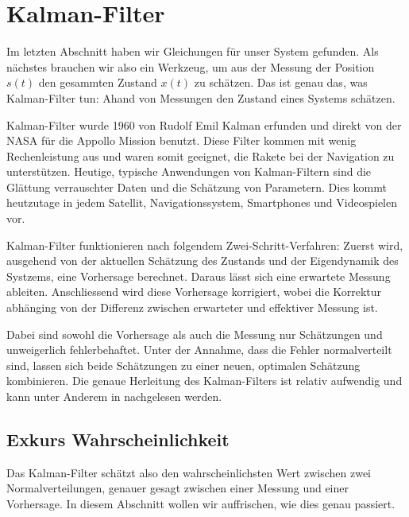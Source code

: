 %
%
%
%
%

\section{Kalman-Filter}
Im letzten Abschnitt haben wir Gleichungen für unser System gefunden.
Als nächstes brauchen wir also ein Werkzeug,
um aus der Messung der Position $s(t)$ den gesammten Zustand $x(t)$ zu schätzen.
Das ist genau das, was Kalman-Filter tun: Ahand von Messungen den Zustand eines Systems schätzen.

Kalman-Filter wurde 1960 von Rudolf Emil Kalman erfunden und direkt von der NASA für die Appollo Mission benutzt.
Diese Filter kommen mit wenig Rechenleistung aus und waren somit geeignet, die Rakete bei der Navigation zu unterstützen. 
Heutige, typische Anwendungen von Kalman-Filtern sind die Glättung verrauschter Daten und die Schätzung von Parametern.
Dies kommt heutzutage in jedem Satellit, Navigationssystem, Smartphones und Videospielen vor.

Kalman-Filter funktionieren nach folgendem Zwei-Schritt-Verfahren:
Zuerst wird,
ausgehend von der aktuellen Schätzung des Zustands und der Eigendynamik des Systzems,
eine Vorhersage berechnet.
Daraus lässt sich eine erwartete Messung ableiten.
Anschliessend wird diese Vorhersage korrigiert,
wobei die Korrektur abhänging von der Differenz zwischen erwarteter und effektiver Messung ist.

Dabei sind sowohl die Vorhersage als auch die Messung nur Schätzungen und unweigerlich fehlerbehaftet.
Unter der Annahme, dass die Fehler normalverteilt sind,
lassen sich beide Schätzungen zu einer neuen, optimalen Schätzung kombinieren.
Die genaue Herleitung des Kalman-Filters ist relativ aufwendig
und kann unter Anderem in \cite{erdbeben:skript:wrstat} nachgelesen werden.

\subsection{Exkurs Wahrscheinlichkeit} 
\label{erdbeben:Wahrscheindlichkeit} 
Das Kalman-Filter schätzt also den wahrscheinlichsten Wert zwischen zwei Normalverteilungen,
genauer gesagt zwischen einer Messung und einer Vorhersage.
In diesem Abschnitt wollen wir auffrischen, wie dies genau passiert.

